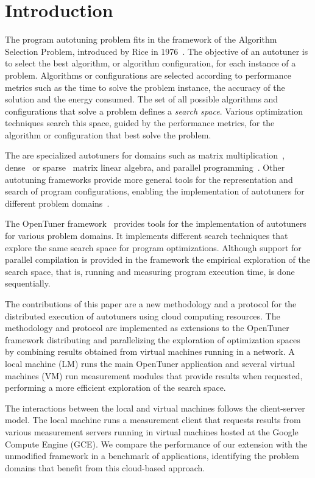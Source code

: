 \section{Introduction} \label{sec:intro}

The program autotuning problem fits in the framework of the Algorithm Selection
Problem, introduced by Rice in 1976~\cite{rice1976algorithm}. The objective of
an autotuner is to select the best algorithm, or algorithm configuration, for
each instance of a problem.  Algorithms or configurations are selected
according to performance metrics such as the time to solve the problem
instance, the accuracy of the solution and the energy consumed.  The set of all
possible algorithms and configurations that solve a problem defines a
\emph{search space}. Various optimization techniques search this space, guided
by the performance metrics, for the algorithm or configuration that best solve
the problem.

The are specialized autotuners for domains such as matrix
multiplication~\cite{bilmes1997phipac}, dense~\cite{whaley1998atlas} or
sparse~\cite{vuduc2005oski} matrix linear algebra, and parallel
programming~\cite{jordan2012multi}. Other autotuning frameworks provide more
general tools for the representation and search of program configurations,
enabling the implementation of autotuners for different problem
domains~\cite{ansel2014opentuner,hutter2009paramils}.

The OpenTuner framework~\cite{ansel2014opentuner} provides tools for the
implementation of autotuners for various problem domains. It implements
different search techniques that explore the same search space for program
optimizations. Although support for parallel compilation is provided in the
framework the empirical exploration of the search space, that is, running and
measuring program execution time, is done sequentially.

The contributions of this paper are a new methodology and a protocol for the
distributed execution of autotuners using cloud computing resources.  The
methodology and protocol are implemented as extensions to the OpenTuner
framework distributing and parallelizing the exploration of optimization spaces
by combining results obtained from virtual machines running in a network.  A
local machine (LM) runs the main OpenTuner application and several virtual
machines (VM) run measurement modules that provide results when requested,
performing a more efficient exploration of the search space.

The interactions between the local and virtual machines follows the
client-server model. The local machine runs a measurement client that requests
results from various measurement servers running in virtual machines hosted at
the Google Compute Engine (GCE).  We compare the performance of our extension
with the unmodified framework in a benchmark of applications,
identifying the problem domains that benefit from this cloud-based approach.


